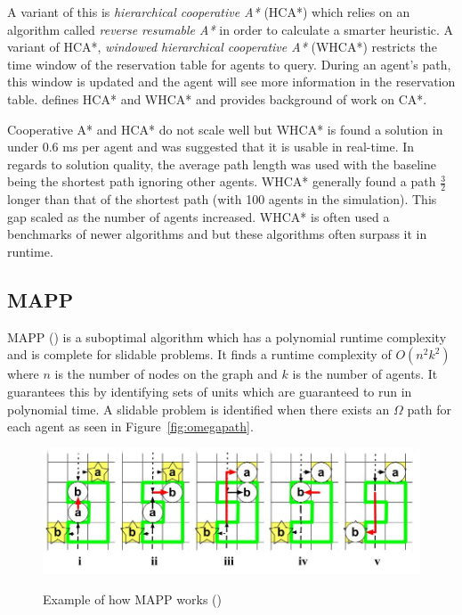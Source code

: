 \documentclass[a4paper,11pt]{article}
\begin{document}
A variant of this is \textit{hierarchical cooperative A*} (HCA*) which relies on an algorithm called \textit{reverse resumable A*} in order to calculate a smarter heuristic. A variant of HCA*, \textit{windowed hierarchical cooperative A*} (WHCA*) restricts the time window of the reservation table for agents to query. During an agent's path, this window is updated and the agent will see more information in the reservation table. \cite{silver2005cooperative} defines HCA* and WHCA* and provides background of work on CA*.

Cooperative A* and HCA* do not scale well but WHCA* is found a solution in under 0.6 ms per agent and was suggested that it is usable in real-time. In regards to solution quality, the average path length was used with the baseline being the shortest path ignoring other agents. WHCA* generally found a path $\frac{3}{2}$ longer than that of the shortest path (with 100 agents in the simulation). This gap scaled as the number of agents increased. WHCA* is often used a benchmarks of newer algorithms and but these algorithms often surpass it in runtime.

\subsection{MAPP}
MAPP (\cite{wang2011mapp}) is a suboptimal algorithm which has a polynomial runtime complexity and is complete for slidable problems. It finds a runtime complexity of $O(n^2k^2)$ where $n$ is the number of nodes on the graph and $k$ is the number of agents. It guarantees this by identifying sets of units which are guaranteed to run in polynomial time. A slidable problem is identified when there exists an $\Omega$ path for each agent as seen in Figure~\ref{fig:omegapath}.


\begin{figure}[H]
	\centering
	\includegraphics[width=\linewidth]{graphics/mappblank}
	\label{fig:mappblank}
	\caption{Example of how MAPP works (\cite{wang2011mapp})}
\end{figure}
\end{document}
